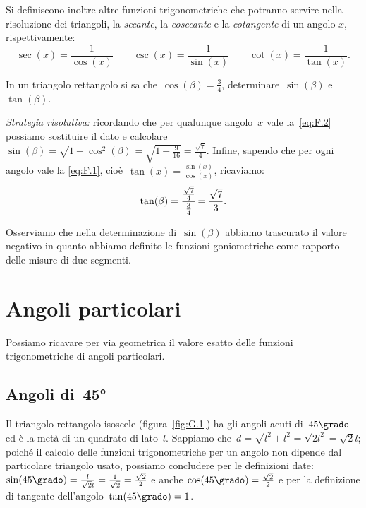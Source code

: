 \begin{definizione}
Si definiscono inoltre altre funzioni trigonometriche che potranno servire nella risoluzione dei triangoli, la
\emph{secante}, la \emph{cosecante} e la \emph{cotangente} di un angolo $x$, rispettivamente:
\[\sec(x)=\frac{1}{\cos(x)}\qquad\csc(x)=\frac{1}{\sin(x)}\qquad\cot(x)=\frac{1}{\tan(x)}.\]
\end{definizione}

\begin{exrig}
 \begin{esempio}
In un triangolo rettangolo si sa che~$\cos(\beta)=\frac{3}{4}$, determinare~$\sin(\beta)$ e~$\tan(\beta)$.

\emph{Strategia risolutiva:}
ricordando che per qualunque angolo~$x$ vale la~\ref{eq:F.2} possiamo sostituire il dato e calcolare
$\sin(\beta)=\sqrt{1-\cos ^{2}(\beta )}=\sqrt{1-\frac{9}{16}}=\frac{\sqrt{7}}{4}$. Infine, sapendo che per ogni
angolo vale la \ref{eq:F.1}, cioè~$\tan(x)=\frac{\sin(x)}{\cos (x)}$, ricaviamo:
\[\tan(\beta)=\cfrac{\frac{\sqrt{7}}{4}}{\frac{3}{4}}=\frac{\sqrt{7}}{3}.\]

Osserviamo che nella determinazione di~$\sin(\beta)$ abbiamo trascurato il valore negativo in quanto abbiamo definito
le funzioni goniometriche come rapporto delle misure di due segmenti.
 \end{esempio}
\end{exrig}

\ovalbox{\risolvi \ref{ese:G.2}}

\section{Angoli particolari}
Possiamo ricavare per via geometrica il valore esatto delle funzioni trigonometriche di angoli particolari.

\subsection{Angoli di~45°}

 Il triangolo rettangolo isoscele (figura~\ref{fig:G.1}) ha gli angoli acuti di~$45\grado$ ed è la metà di un quadrato di lato~$l$.
Sappiamo che~$d=\sqrt{l^{2}+l^{2}}=\sqrt{2l^2}=\sqrt{2}l$; poiché il calcolo delle funzioni trigonometriche per un angolo
non dipende dal particolare triangolo usato, possiamo concludere per le definizioni date:
$\sin(45\grado)=\frac{l}{\sqrt{2}l}=\frac{1}{\sqrt{2}}=\frac{\sqrt{2}}{2}$ e anche
$\cos(45\grado)=\frac{\sqrt{2}}{2}$ e per la definizione di tangente dell'angolo~$\tan(45\grado)=1$.


